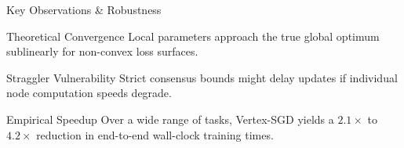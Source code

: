 \begin{frame}{Key Observations \& Robustness}
    \begin{block}{Theoretical Convergence}
        Local parameters approach the true global optimum sublinearly for non-convex loss surfaces.
    \end{block}
    
    \begin{alertblock}{Straggler Vulnerability}
        Strict consensus bounds might delay updates if individual node computation speeds degrade.
    \end{alertblock}
    
    \begin{exampleblock}{Empirical Speedup}
        Over a wide range of tasks, Vertex-SGD yields a $2.1\times$ to $4.2\times$ reduction in end-to-end wall-clock training times.
    \end{exampleblock}
\end{frame}

